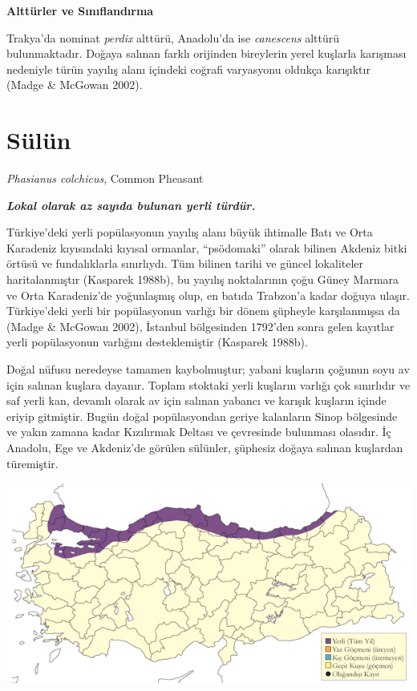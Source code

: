 \documentclass[
  letterpaper,
  DIV=11,
  numbers=noendperiod]{scrreprt}
\begin{document}
\textbf{Alttürler ve Sınıflandırma}

Trakya'da nominat \emph{perdix} alttürü, Anadolu'da ise \emph{canescens}
alttürü bulunmaktadır. Doğaya salınan farklı orijinden bireylerin yerel
kuşlarla karışması nedeniyle türün yayılış alanı içindeki coğrafi
varyasyonu oldukça karışıktır (Madge \& McGowan 2002).

\section{Sülün}\label{suxfcluxfcn}

\emph{Phasianus colchicus}, Common Pheasant

\textbf{\emph{Lokal olarak az sayıda bulunan yerli türdür.}}

Türkiye'deki yerli popülasyonun yayılış alanı büyük ihtimalle Batı ve
Orta Karadeniz kıyısındaki kıyısal ormanlar, ``psödomaki'' olarak
bilinen Akdeniz bitki örtüsü ve fundalıklarla sınırlıydı. Tüm bilinen
tarihi ve güncel lokaliteler haritalanmıştır (Kasparek 1988b), bu
yayılış noktalarının çoğu Güney Marmara ve Orta Karadeniz'de yoğunlaşmış
olup, en batıda Trabzon'a kadar doğuya ulaşır. Türkiye'deki yerli bir
popülasyonun varlığı bir dönem şüpheyle karşılanmışsa da (Madge \&
McGowan 2002), İstanbul bölgesinden 1792'den sonra gelen kayıtlar yerli
popülasyonun varlığını desteklemiştir (Kasparek 1988b).

Doğal nüfusu neredeyse tamamen kaybolmuştur; yabani kuşların çoğunun
soyu av için salınan kuşlara dayanır. Toplam stoktaki yerli kuşların
varlığı çok sınırlıdır ve saf yerli kan, devamlı olarak av için salınan
yabancı ve karışık kuşların içinde eriyip gitmiştir. Bugün doğal
popülasyondan geriye kalanların Sinop bölgesinde ve yakın zamana kadar
Kızılırmak Deltası ve çevresinde bulunması olasıdır. İç Anadolu, Ege ve
Akdeniz'de görülen sülünler, şüphesiz doğaya salınan kuşlardan
türemiştir.

\includegraphics{images/harita_Page_044.png}
\end{document}
